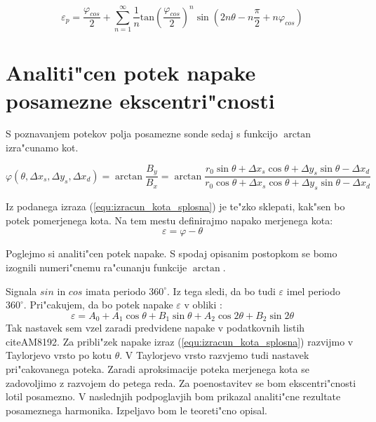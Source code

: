 \begin{equation}
\label{vrsta_faza_sin}
\varepsilon_p = \frac{\varphi_{cos}}{2} + \sum_{n=1}^{\infty}\frac{1}{n} \mathrm{tan}(\frac{\varphi_{cos}}{2})^n \sin (2n \theta-n \frac{\pi}{2}+n \varphi_{cos})
\end{equation}
















\section{Analiti"cen potek napake posamezne ekscentri"cnosti}

S poznavanjem potekov polja posamezne sonde sedaj s funkcijo $\arctan$ izra"cunamo kot.

\begin{equation}
\label{equ:izracun_kota_splosna}
\varphi(\theta,\Delta x_s, \Delta y_s, \Delta x_d)=\arctan\frac{B_y}{B_x}=\arctan\frac{r_0 \sin\theta +\Delta x_s \cos\theta +\Delta y_s \sin\theta-\Delta x_d}{r_0 \cos\theta +\Delta x_s \cos\theta +\Delta y_s \sin\theta -\Delta x_d}
\end{equation}




Iz podanega izraza (\ref{equ:izracun_kota_splosna}) je te"zko sklepati, kak"sen bo potek pomerjenega kota.
Na tem mestu definirajmo napako merjenega kota:
\begin{equation}
\varepsilon=\varphi-\theta
\end{equation}

Poglejmo si analiti"cen potek napake.  S spodaj opisanim postopkom se bomo izognili numeri"cnemu ra"cunanju funkcije $\arctan$.

Signala $sin$ in $cos$ imata periodo $360^\circ$. Iz tega sledi, da bo tudi $\varepsilon$ imel periodo $360^\circ $. Pri"cakujem, da bo potek napake $\varepsilon$ v obliki :
\begin{equation}
\label{equ:nastavek}
\varepsilon=A_0+A_1 \cos \theta +B_1 \sin \theta+A_2 \cos 2\theta +B_2 \sin 2\theta
\end{equation}
Tak nastavek sem vzel zaradi predvidene napake v podatkovnih listih citeAM8192.
Za pribli"zek napake izraz  (\ref{equ:izracun_kota_splosna}) razvijmo v Taylorjevo vrsto po kotu $\theta$. V Taylorjevo vrsto razvjemo tudi nastavek pri"cakovanega poteka. Zaradi aproksimacije poteka merjenega kota se zadovoljimo z razvojem do petega reda. Za poenostavitev se bom ekscentri"cnosti lotil posamezno. V naslednjih podpoglavjih bom prikazal analiti"cne rezultate posameznega harmonika. Izpeljavo bom le teoreti"cno opisal.

